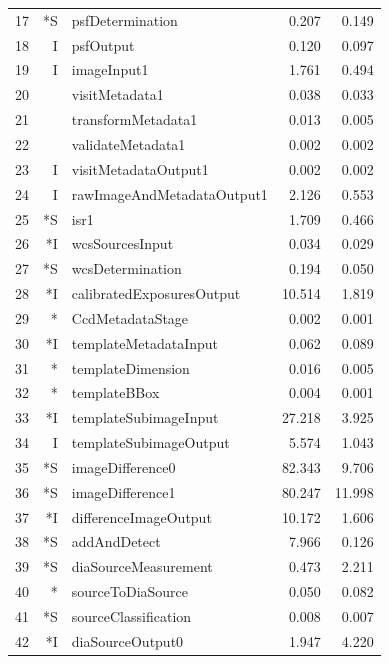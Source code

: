 \begin{table}[htbp]
\begin{center}
\begin{tabular}{lrlrr}
17 & *S &              psfDetermination &  0.207 &  0.149 \\
18 &  I &                     psfOutput &  0.120 &  0.097 \\
19 &  I &                   imageInput1 &  1.761 &  0.494 \\
20 &    &                visitMetadata1 &  0.038 &  0.033 \\
21 &    &            transformMetadata1 &  0.013 &  0.005 \\
22 &    &             validateMetadata1 &  0.002 &  0.002 \\
23 &  I &          visitMetadataOutput1 &  0.002 &  0.002 \\
24 &  I &    rawImageAndMetadataOutput1 &  2.126 &  0.553 \\
25 & *S &                          isr1 &  1.709 &  0.466 \\
26 & *I &               wcsSourcesInput &  0.034 &  0.029 \\
27 & *S &              wcsDetermination &  0.194 &  0.050 \\
28 & *I &     calibratedExposuresOutput & 10.514 &  1.819 \\
29 & *\phantom{I}  &              CcdMetadataStage &  0.002 &  0.001 \\
30 & *I &         templateMetadataInput &  0.062 &  0.089 \\
31 & *\phantom{I}  &             templateDimension &  0.016 &  0.005 \\
32 & *\phantom{I}  &                  templateBBox &  0.004 &  0.001 \\
33 & *I &         templateSubimageInput & 27.218 &  3.925 \\
34 &  I &        templateSubimageOutput &  5.574 &  1.043 \\
35 & *S &              imageDifference0 & 82.343 &  9.706 \\
36 & *S &              imageDifference1 & 80.247 & 11.998 \\
37 & *I &         differenceImageOutput & 10.172 &  1.606 \\
38 & *S &                  addAndDetect &  7.966 &  0.126 \\
39 & *S &          diaSourceMeasurement &  0.473 &  2.211 \\
40 & *\phantom{I}  &             sourceToDiaSource &  0.050 &  0.082 \\
41 & *S &          sourceClassification &  0.008 &  0.007 \\
42 & *I &              diaSourceOutput0 &  1.947 &  4.220 \\

\end{tabular}
\end{center}
\end{table}
